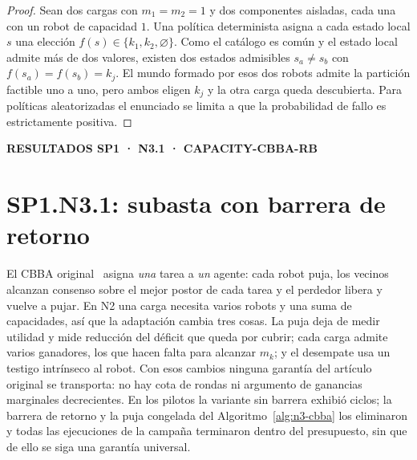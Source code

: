 \documentclass[12pt,a4paper]{article}
\newcommand{\leveltag}[1]{%
  \noindent\colorbox{VIUDark}{%
    \parbox{\dimexpr\textwidth-2\fboxsep\relax}{%
      \color{white}\sffamily\bfseries\small #1%
    }%
  }\par\smallskip
}
\begin{document}
{\small
\begin{proof}
Sean dos cargas con $m_1=m_2=1$ y dos componentes aisladas, cada una con un
robot de capacidad $1$. Una política determinista asigna a cada estado local
$s$ una elección $f(s)\in\{k_1,k_2,\varnothing\}$. Como el catálogo es común y
el estado local admite más de dos valores, existen dos estados admisibles
$s_a\neq s_b$ con $f(s_a)=f(s_b)=k_j$. El mundo formado por esos dos robots
admite la partición factible uno a uno, pero ambos eligen $k_j$ y la otra carga
queda descubierta. Para políticas aleatorizadas el enunciado se limita a que la
probabilidad de fallo es estrictamente positiva.
\end{proof}
}

\clearpage

\leveltag{RESULTADOS SP1 · N3.1 · CAPACITY-CBBA-RB}
\section*{SP1.N3.1: subasta con barrera de retorno}

El CBBA original~\parencite{choiBrunetHow2009CBBA} asigna \emph{una} tarea a
\emph{un} agente: cada robot puja, los vecinos alcanzan consenso sobre el mejor
postor de cada tarea y el perdedor libera y vuelve a pujar. En N2 una carga
necesita varios robots y una suma de capacidades, así que la adaptación cambia
tres cosas. La puja deja de medir utilidad y mide reducción del déficit que
queda por cubrir; cada carga admite varios ganadores, los que hacen falta para
alcanzar $m_k$; y el desempate usa un testigo intrínseco al robot. Con esos
cambios ninguna garantía del artículo original se transporta: no hay cota de
rondas ni argumento de ganancias marginales decrecientes. En los pilotos la
variante sin barrera exhibió ciclos; la barrera de retorno y la puja congelada
del Algoritmo~\ref{alg:n3-cbba} los eliminaron y todas las ejecuciones de la
campaña terminaron dentro del presupuesto, sin que de ello se siga una garantía
universal.
\end{document}
